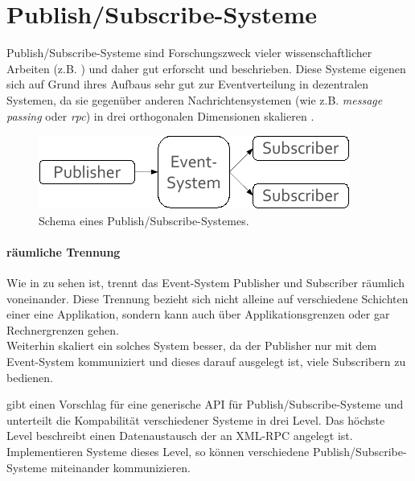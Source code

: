 \section{Publish/Subscribe-Systeme}
\label{chap:grundlagen:pubsub}

Publish/Subscribe-Systeme sind Forschungszweck vieler wissenschaftlicher Arbeiten (z.B. \cite{Banerjee2001Comparative, Liu2003Survey, Muhl2002LargeScale, FiegeSecurity, Castro2002Scribe}) und daher gut erforscht und beschrieben. Diese Systeme eigenen sich auf Grund ihres Aufbaus sehr gut zur Eventverteilung in dezentralen Systemen, da sie gegenüber anderen Nachrichtensystemen (wie z.B. \emph{message passing} oder \emph{rpc}) in drei orthogonalen Dimensionen skalieren \cite{PatrickTh2003Many}.

\begin{figure}[htbp]
\centering
\includegraphics{grafics/pubsub_black_box.pdf}
\caption{Schema eines Publish/Subscribe-Systemes.}
\label{fig:pubsub_black_box}
\end{figure}

\paragraph{räumliche Trennung}
Wie in  zu sehen ist, trennt das Event-System Publisher und Subscriber räumlich voneinander. Diese Trennung bezieht sich nicht alleine auf verschiedene Schichten einer eine Applikation, sondern kann auch über Applikationsgrenzen oder gar Rechnergrenzen gehen.\\
Weiterhin skaliert ein solches System besser, da der Publisher nur mit dem Event-System kommuniziert und dieses darauf ausgelegt ist, viele Subscribern zu bedienen.

\cite{PiEyKoSh2007-PubSubAPI} gibt einen Vorschlag für eine generische API für Publish/Subscribe-Systeme und unterteilt die Kompabilität verschiedener Systeme in drei Level. Das höchste Level beschreibt einen Datenaustausch der an XML-RPC angelegt ist. Implementieren Systeme dieses Level, so können verschiedene Publish/Subscribe-Systeme miteinander kommunizieren.

